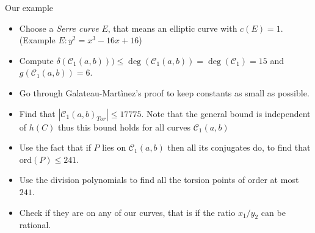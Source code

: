 \documentclass[handout]{beamer}
\begin{document}
\begin{frame}{Our example}
\begin{itemize}
\item Choose a \textit{Serre curve} $E$, that means an elliptic curve with $c(E)=1$. (Example $E \colon y^2  = x^3 - 16 x + 16 $) \pause
\item Compute $\delta(\mathcal{C}_1(a,b)))\le 
	\deg(\mathcal{C}_1(a,b)) = \deg(\mathcal{C}_1) = 15$ and $g(\mathcal{C}_1(a,b)) = 6$.\pause
\item Go through Galateau-Mart\`inez's proof to keep constants as small as possible.\pause
\item Find that $|\mathcal{C}_1(a,b)_{Tor}|\le 17775$. \newline \indent\hspace{0.5cm} Note that the general bound is independent of $h(C)$ thus this bound holds for all  curves $\mathcal{C}_1(a,b)$\pause
\item Use the fact that if $P$ lies on $\mathcal{C}_1(a,b)$ then all its conjugates do, to find that $\mathrm{ord}(P)\le 241$. \pause
\item Use the division polynomials to find all the torsion points of order at most $241$.\pause
\item Check if they are on any of our curves, that is if the ratio $x_1/y_2$ can be rational. 
 \end{itemize}

\end{frame}
\end{document}
